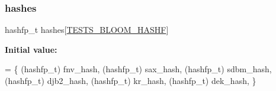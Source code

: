 \subsubsection{\texorpdfstring{hashes}{hashes}}
{\footnotesize\ttfamily hashfp\+\_\+t hashes\mbox{[}\hyperlink{tests-bloom_8c_a301bba6dcc93225ff24b711b215d5f64}{T\+E\+S\+T\+S\+\_\+\+B\+L\+O\+O\+M\+\_\+\+H\+A\+S\+HF}\mbox{]}}

{\bfseries Initial value\+:}
\begin{DoxyCode}
= \{
                     (hashfp\_t) fnv\_hash,
                     (hashfp\_t) sax\_hash,
                     (hashfp\_t) sdbm\_hash,
                     (hashfp\_t) djb2\_hash,
                     (hashfp\_t) kr\_hash,
                     (hashfp\_t) dek\_hash,
                    \}
\end{DoxyCode}
